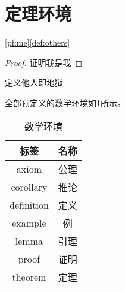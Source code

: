 \section{定理环境}

\cref{pf:me}\cref{def:others}

\begin{proof}\label{pf:me}
    证明我是我
\end{proof}

\begin{definition}[他人]\label{def:others}
    定义他人即地狱
\end{definition}

全部预定义的数学环境如\cref{tab:mathenv}所示。

\begin{table}[htbp]
    \centering
    \caption{数学环境}
    \label{tab:mathenv}
    \begin{tabular}{cc}
        \toprule
        标签 & 名称 \\
        \midrule
        axiom & 公理 \\
        corollary & 推论 \\
        definition & 定义 \\
        example & 例 \\ 
        lemma & 引理 \\
        proof & 证明 \\
        theorem & 定理 \\
        \bottomrule
    \end{tabular}
\end{table}
